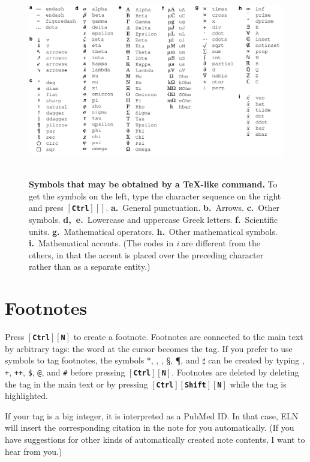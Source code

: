 \documentclass[11pt]{report}
\def\keystroke#1{$\left[\right.\!${\tt\bfseries #1}$\!\left.\right]$}
\def\keycombo#1#2{\keystroke{#1}\keystroke{#2}}
\def\keycontrol#1{\keycombo{Ctrl}{#1}}
\def\controlshift#1{\keystroke{Ctrl}\keystroke{Shift}\keystroke{#1}}
\def\keyctrlbackslash{\keycontrol{\char92}}
\begin{document}
\begin{figure}
\noindent~\hfill\includegraphics[scale=.85]{../doc/texcodes.pdf}\hfill~\vspace{-7pt}

\caption{{\bf Symbols that may be obtained by a TeX-like command.} To
  get the symbols on the left, type the character sequence on the
  right and press \keyctrlbackslash.  {\bf a.}~General
  punctuation. {\bf b.}~Arrows. {\bf c.}~Other symbols. {\bf
    d,~e.}~Lowercase and uppercase Greek letters. {\bf f.}~Scientific
  units. {\bf g.}~Mathematical operators. {\bf h.}~Other mathematical
  symbols. {\bf i.}~Mathematical accents. (The codes in \emph{i} are
  different from the others, in that the accent is placed over the
  preceding character rather than as a separate
  entity.)}\label{fig:texcodes}
\end{figure}


\section{Footnotes}

Press \keycontrol{N} to create a footnote. Footnotes are connected to
the main text by arbitrary tags: the word at the cursor becomes the
tag.  If you prefer to use symbols to tag footnotes, the symbols *,
\dag, \ddag, \S, \P, and $\sharp$ can be created by typing {\tt *},
    {\tt +}, {\tt ++}, {\tt\$}, {\tt @}, and {\tt \#} before pressing
    \keycontrol{N}. Footnotes are deleted by deleting the tag in the
    main text or by pressing \controlshift{N} while the tag is
    highlighted.

If your tag is a big integer, it is interpreted as a PubMed ID. In
that case, ELN will insert the corresponding citation in the note for
you automatically. (If you have suggestions for other kinds of
automatically created note contents, I want to hear from you.)
\end{document}

